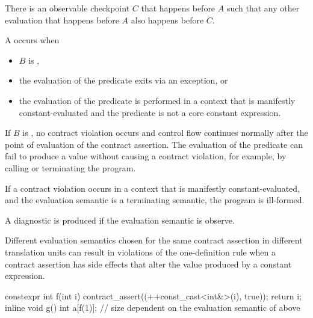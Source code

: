 \pnum
There is an observable checkpoint $C$
that happens before $A$
such that any other evaluation
that happens before $A$
also happens before $C$.

\pnum
A  occurs when
\begin{itemize}
\item
$B$ is ,
\item
the evaluation of the predicate
exits via an exception, or
\item
the evaluation of the predicate
is performed in a context that is
manifestly constant-evaluated
and the predicate
is not a core constant expression.
\end{itemize}

\begin{note}
If $B$ is ,
no contract violation occurs and
control flow continues normally
after the point of evaluation of the contract assertion.
The evaluation of the predicate
can fail to produce a value
without causing a contract violation,
for example,
by calling 
or terminating the program.
\end{note}

\pnum
{}%
If a contract violation occurs
in a context that is manifestly constant-evaluated,
and the evaluation semantic is
a terminating semantic,
the program is ill-formed.

\begin{note}
A diagnostic is produced
if the evaluation semantic is observe.
\end{note}

\begin{note}
Different evaluation semantics
chosen for the same contract assertion
in different translation units
can result in
violations of the one-definition rule
when a contract assertion has side effects
that alter the value produced by a constant expression.
\begin{example}
\begin{codeblock}
constexpr int f(int i)
{
  contract_assert((++const_cast<int&>(i), true));
  return i;
}
inline void g()
{
  int a[f(1)];  // size dependent on the evaluation semantic of  above
}
\end{codeblock}
\end{example}
\end{note}

